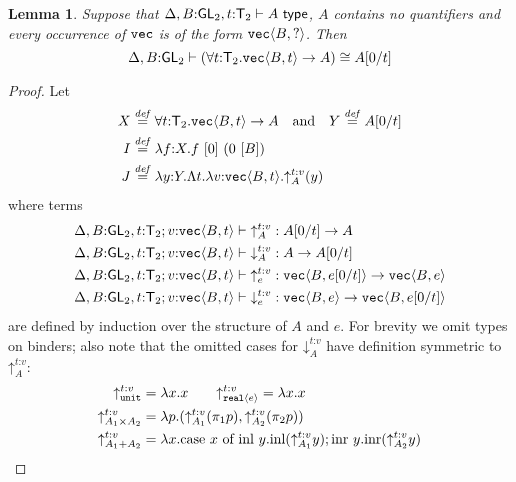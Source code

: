 \documentclass{sigplanconf}
\newcommand{\SynTransl}[1]{\mathsf{T}_#1}
\newcommand{\tyPrim}[2]{\textup{\texttt{#1}}\langle #2 \rangle}
\newcommand{\tyPrimNm}[1]{\textup{\texttt{#1}}}
\newcommand{\isType}{\textup{\textsf{ type}}}
\newtheorem{lemma}{Lemma}
\newcommand{\isDefinedAs}{\stackrel{\mathit{def}}=}
\theoremstyle{examplestyle}
\theoremstyle{restatementstyle}
\begin{document}
\newcommand{\transup}[3]{\mathord\uparrow_{#1}^{#2\mathord:#3}}
\newcommand{\transdn}[3]{\mathord\downarrow_{#1}^{#2\mathord:#3}}
\newcommand{\transtrans}[3]{\mathrm{tr}_{#1}^{#2\mathord:#3}}

\begin{lemma}\label{lem:transiso}
Suppose that $\DeltaWithB,t\mathord:\SynTransl{2}\vdash A \isType$, 
$A$ contains no quantifiers and every occurrence of $\tyPrimNm{vec}$ is of the form $\tyPrim{vec}{B,?}$. Then
\[
\DeltaWithB\vdash(\forall t\mathord:\SynTransl{2}.\tyPrim{vec}{B,t}\to A)
\cong A[0/t]
\]
\end{lemma}
\begin{proof}
Let 
\begin{align*}
X & \isDefinedAs \forall t\mathord:\SynTransl{2}.\tyPrim{vec}{B,t}\to A
\quad\text{and}\quad Y \isDefinedAs A[0/t]\\
I & \isDefinedAs \lambda f\mathord: X. f\ [0]\ (0\ [B])\\
J & \isDefinedAs \lambda y\mathord: Y. \Lambda t.\lambda v\mathord:\tyPrim{vec}{B,t}. \transup A t v (y)
\end{align*}
where terms 
\begin{align*}
&\DeltaWithB,t\mathord:\SynTransl{2};v\mathord:\tyPrim{vec}{B,t}\vdash \transup A t v : A[0/t] \to A\\
&\DeltaWithB,t\mathord:\SynTransl{2};v\mathord:\tyPrim{vec}{B,t}\vdash \transdn A t v : A\to A[0/t]\\
&\DeltaWithB,t\mathord:\SynTransl{2};v\mathord:\tyPrim{vec}{B,t}\vdash \transup e t v : \tyPrim{vec}{B,e[0/t]}\to\tyPrim{vec}{B,e}\\
&\DeltaWithB,t\mathord:\SynTransl{2};v\mathord:\tyPrim{vec}{B,t}\vdash \transdn e t v : \tyPrim{vec}{B,e}\to\tyPrim{vec}{B,e[0/t]}
\end{align*}
are defined by induction over the structure of $A$ and $e$. For brevity we omit types on binders;
also note that the omitted cases for $\transdn A t v$ 
have definition symmetric to $\transup A t v$:
\begin{align*}
\transup{\tyPrimNm{unit}} t v &= \lambda x. x
\qquad 
\transup{\tyPrim{real}{e}} t v = \lambda x. x
\\
\transup{A_1\times A_2}t v &= \lambda p. (\transup{A_1}t v(\pi_1 p),\transup{A_2}t v(\pi_2 p))
\\
\transup{A_1 + A_2} t v &= \lambda x.
\textrm{case}\ x\ \textrm{of}\ \textrm{inl}\ y.\textrm{inl}(\transup {A_1}t v y); \textrm{inr}\ y.\textrm{inr}(\transup {A_2} t v y)
\\ 

\end{align*}
\end{proof}
\end{document}
